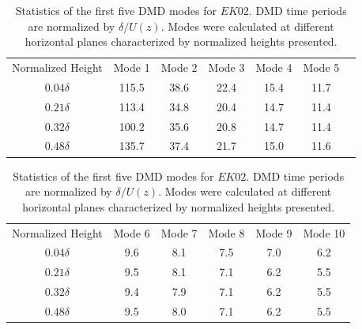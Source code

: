 \begin{table}
\caption{Statistics of the first five DMD modes for $EK02$. DMD time periods are normalized by $\delta / U(z)$. Modes were calculated at different horizontal planes characterized by normalized heights presented.}
\begin{center}
\small
\begin{tabular}{  c c c c c c c} 
\hline
\hline  
Normalized Height  & Mode 1 & Mode 2 & Mode 3 & Mode 4 & Mode 5  \\

\multirow{1}{4em}{$0.04\delta$}  & 115.5 & 38.6 & 22.4 & 15.4 & 11.7  \\
\hline
\multirow{1}{4em}{$0.21\delta$}  & 113.4 & 34.8 & 20.4 & 14.7 & 11.4  \\ 
\hline
\multirow{1}{4em}{$0.32\delta$} & 100.2  & 35.6 & 20.8 & 14.7 & 11.4  \\ 
\hline
\multirow{1}{4em}{$0.48\delta$} & 135.7  & 37.4 & 21.7 & 15.0 & 11.6  \\ 

\end{tabular}
\begin{tabular}{  c c c c c c} 
\hline
Normalized Height  & Mode 6 & Mode 7 & Mode 8 & Mode 9 & Mode 10 \\

\multirow{1}{4em}{$0.04\delta$} & 9.6 & 8.1 & 7.5 & 7.0 & 6.2  \\
\hline
\multirow{1}{4em}{$0.21\delta$}  & 9.5 & 8.1 & 7.1 & 6.2 & 5.5  \\ 
\hline
\multirow{1}{4em}{$0.32\delta$}  & 9.4 & 7.9 & 7.1 & 6.2 & 5.5   \\ 
\hline
\multirow{1}{4em}{$0.48\delta$}  & 9.5 & 8.0 & 7.1 & 6.2 & 5.5   \\ 
\hline
\hline
\end{tabular}
\end{center}
\label{tab:dmd_freq_ek02}
\end{table}



